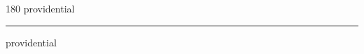 
\begin{frame}
\begin{center}
\begin{turn}{180}
{\fontsize{2.5cm}{1em}\selectfont providential}
\end{turn}
\vspace{1em}\par  
\hrule
\vspace{1em}\par  
{\fontsize{2.5cm}{1em}\selectfont providential}
\end{center}
\end{frame}
